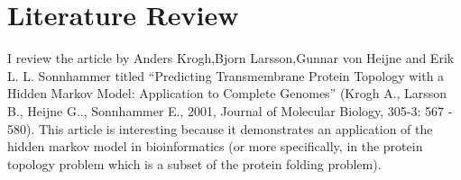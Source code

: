 \documentclass[9.5pt]{extarticle}
\begin{document}
\begin{table}[H]
\centering
\caption{Experiements performed to measure improvement in probability distribution using the forward-backward smoothing method for medium.maz (with all sensor data being correct). The number given is the probability generated of the robot being in the actual location}
\label{my-label}
\end{table}

\begin{table}[H]
\centering
\caption{Experiements performed to measure improvement in probability distribution using the forward-backward smoothing method for medium.maz (with one incorrect sensor data). The number given is the probability generated of the robot being in the actual location}
\label{my-label}
\end{table}


\section{Literature Review}

I review the article by Anders Krogh,Bjorn Larsson,Gunnar von Heijne and Erik L. L. Sonnhammer titled ``Predicting Transmembrane Protein Topology with a Hidden Markov Model: Application to
Complete Genomes'' (Krogh A., Larsson B., Heijne G.., Sonnhammer E., 2001, Journal of Molecular Biology, 305-3: 567 - 580). This article is interesting because it demonstrates an application of the hidden markov model in bioinformatics (or more specifically, in the protein topology problem which is a subset of the protein folding problem).\\
\end{document}

